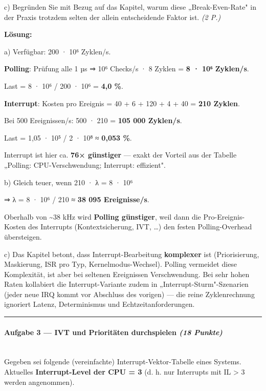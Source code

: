 \documentclass[11pt, a4paper]{article}
\begin{document}
c) Begründen Sie mit Bezug auf das Kapitel, warum diese „Break-Even-Rate" in der Praxis trotzdem selten der allein entscheidende Faktor ist. \textit{(2 P.)}


\textbf{Lösung:}


a) Verfügbar: 200 · 10⁶ Zyklen/s.


\textbf{Polling}: Prüfung alle 1 µs ⇒ 10⁶ Checks/s · 8 Zyklen = \textbf{8 · 10⁶ Zyklen/s}.

Last = 8 · 10⁶ / 200 · 10⁶ = \textbf{4,0 \%}.


\textbf{Interrupt}: Kosten pro Ereignis = 40 + 6 + 120 + 4 + 40 = \textbf{210 Zyklen}.

Bei 500 Ereignissen/s: 500 · 210 = \textbf{105 000 Zyklen/s}.

Last = 1,05 · 10⁵ / 2 · 10⁸ ≈ \textbf{0,053 \%}.


Interrupt ist hier ca. \textbf{76× günstiger} — exakt der Vorteil aus der Tabelle „Polling: CPU-Verschwendung; Interrupt: effizient".


b) Gleich teuer, wenn 210 · λ = 8 · 10⁶

⇒ λ = 8 · 10⁶ / 210 ≈ \textbf{38 095 Ereignisse/s}.


Oberhalb von \textasciitilde{}38 kHz wird \textbf{Polling günstiger}, weil dann die Pro-Ereignis-Kosten des Interrupts (Kontextsicherung, IVT, …) den festen Polling-Overhead übersteigen.


c) Das Kapitel betont, dass Interrupt-Bearbeitung \textbf{komplexer} ist (Priorisierung, Maskierung, ISR pro Typ, Kernelmodus-Wechsel). Polling vermeidet diese Komplexität, ist aber bei seltenen Ereignissen Verschwendung. Bei sehr hohen Raten kollabiert die Interrupt-Variante zudem in „Interrupt-Sturm"-Szenarien (jeder neue IRQ kommt vor Abschluss des vorigen) — die reine Zyklenrechnung ignoriert Latenz, Determinismus und Echtzeitanforderungen.



\noindent\textcolor{rulegray}{\rule{\linewidth}{0.4pt}}


\paragraph{Aufgabe 3 — IVT und Prioritäten durchspielen \textit{(18 Punkte)}}\mbox{}\\[2pt]

Gegeben sei folgende (vereinfachte) Interrupt-Vektor-Tabelle eines Systems. Aktuelles \textbf{Interrupt-Level der CPU = 3} (d. h. nur Interrupts mit IL > 3 werden angenommen).
\end{document}
